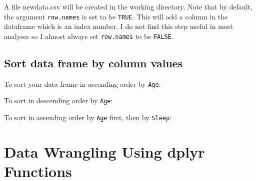 \documentclass[
]{book}
\newenvironment{Shaded}{\begin{snugshade}}{\end{snugshade}}
\newcommand{\FunctionTok}[1]{\textcolor[rgb]{0.13,0.29,0.53}{\textbf{#1}}}
\newcommand{\NormalTok}[1]{#1}
\newcommand{\OtherTok}[1]{\textcolor[rgb]{0.56,0.35,0.01}{#1}}
\newcommand{\SpecialCharTok}[1]{\textcolor[rgb]{0.81,0.36,0.00}{\textbf{#1}}}
\begin{document}
A file newdata.csv will be created in the working directory. Note that by default, the argument \texttt{row.names} is set to be \texttt{TRUE}. This will add a column in the dataframe which is an index number. I do not find this step useful in most analyses so I almost always set \texttt{row.names} to be \texttt{FALSE}.

\hypertarget{sort-data-frame-by-column-values}{%
\subsection{Sort data frame by column values}\label{sort-data-frame-by-column-values}}

To sort your data frame in ascending order by \texttt{Age}:

\begin{Shaded}
\end{Shaded}

To sort in descending order by \texttt{Age}:

\begin{Shaded}
\end{Shaded}

To sort in ascending order by \texttt{Age} first, then by \texttt{Sleep}:

\begin{Shaded}
\end{Shaded}

\hypertarget{data-wrangling-using-dplyr-functions}{%
\section{Data Wrangling Using dplyr Functions}\label{data-wrangling-using-dplyr-functions}}
\end{document}
